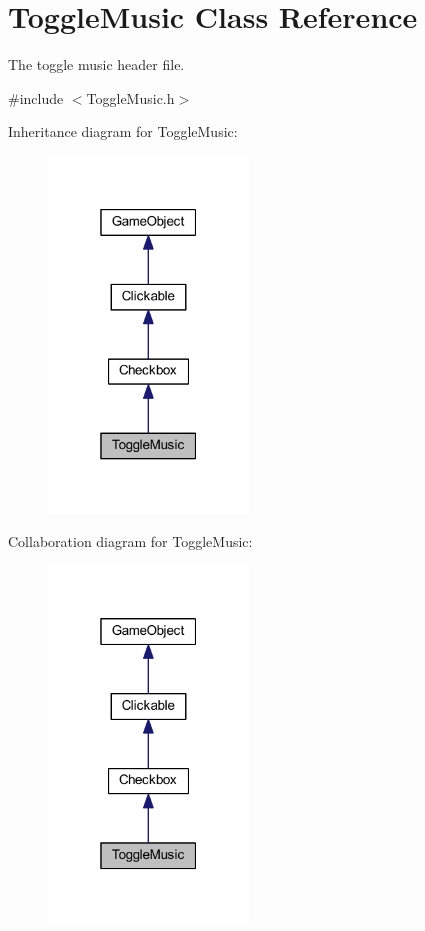 \hypertarget{class_toggle_music}{\section{Toggle\+Music Class Reference}
\label{class_toggle_music}
}


The toggle music header file.  




{\ttfamily \#include $<$Toggle\+Music.\+h$>$}



Inheritance diagram for Toggle\+Music\+:\nopagebreak
\begin{figure}[H]
\begin{center}
\leavevmode
\includegraphics[width=151pt]{class_toggle_music__inherit__graph}
\end{center}
\end{figure}


Collaboration diagram for Toggle\+Music\+:\nopagebreak
\begin{figure}[H]
\begin{center}
\leavevmode
\includegraphics[width=151pt]{class_toggle_music__coll__graph}
\end{center}
\end{figure}
